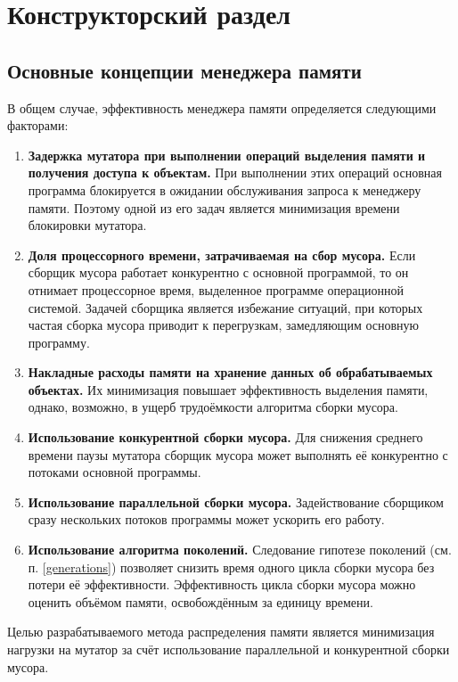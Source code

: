 \chapter{Конструкторский раздел}



\section{Основные концепции менеджера памяти}

В общем случае, эффективность менеджера памяти определяется следующими факторами:

\begin{enumerate}[label*=\arabic*.]
	\item \textbf{Задержка мутатора при выполнении операций выделения памяти и получения доступа к объектам.} При выполнении этих операций основная программа блокируется в ожидании обслуживания запроса к менеджеру памяти. Поэтому одной из его задач является минимизация времени блокировки мутатора.
	\item \textbf{Доля процессорного времени, затрачиваемая на сбор мусора.} Если сборщик мусора работает конкурентно с основной программой, то он отнимает процессорное время, выделенное программе операционной системой. Задачей сборщика является избежание ситуаций, при которых частая сборка мусора приводит к перегрузкам, замедляющим основную программу.
	\item \textbf{Накладные расходы памяти на хранение данных об обрабатываемых объектах.} Их минимизация повышает эффективность выделения памяти, однако, возможно, в ущерб трудоёмкости алгоритма сборки мусора.
	\item \textbf{Использование конкурентной сборки мусора.} Для снижения среднего времени паузы мутатора сборщик мусора может выполнять её конкурентно с потоками основной программы.
	\item \textbf{Использование параллельной сборки мусора.} Задействование сборщиком сразу нескольких потоков программы может ускорить его работу.
	\item \textbf{Использование алгоритма поколений.} Следование гипотезе поколений (см. п. \ref{generations}) позволяет снизить время одного цикла сборки мусора без потери её эффективности. Эффективность цикла сборки мусора можно оценить объёмом памяти, освобождённым за единицу времени.
\end{enumerate}

Целью разрабатываемого метода распределения памяти является минимизация нагрузки на мутатор за счёт использование параллельной и конкурентной сборки мусора.

